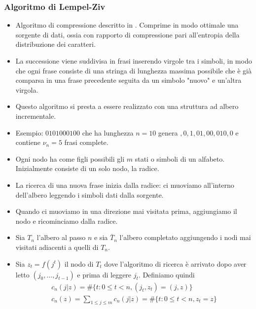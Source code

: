 \documentclass{beamer}
\theoremstyle{plain}
\theoremstyle{definition}
\theoremstyle{remark}
\begin{document}
\begin{frame}
\frametitle{Algoritmo di Lempel-Ziv}
\begin{itemize}
\item Algoritmo di compressione descritto in \cite{LZ78}. Comprime in modo ottimale una sorgente di dati, ossia con rapporto di compressione pari all'entropia della distribuzione dei caratteri.
\item La successione viene suddivisa in frasi inserendo virgole tra i simboli, in modo che ogni frase consiste di una stringa di lunghezza massima possibile che è già comparsa in una frase precedente seguita da un simbolo "nuovo" e un'altra virgola.
\item Questo algoritmo si presta a essere realizzato con una struttura ad albero incrementale.
\item Esempio: $0101000100$ che ha lunghezza $n=10$ genera $,0,1,01,00,010,0$ e contiene $\nu_n=5$ frasi complete.
\end{itemize}
\end{frame}

\begin{frame}
\begin{itemize}
\item Ogni nodo ha come figli possibili gli $m$ stati o simboli di un alfabeto. Inizialmente consiste di un solo nodo, la radice.
\item La ricerca di una nuova frase inizia dalla radice: ci muoviamo all'interno dell'albero leggendo i simboli dati dalla sorgente.
\item Quando ci muoviamo in una direzione mai visitata prima, aggiungiamo il nodo e ricominciamo dalla radice.
\item Sia $T_n$ l'albero al passo $n$ e sia $\bar{T}_n$ l'albero completato aggiungendo i nodi mai visitati adiacenti a quelli di $T_n$.
\item Sia $z_t = f(j^t)$ il nodo di $T_t$ dove l'algoritmo di ricerca è arrivato dopo aver letto $(j_0,\ldots,j_{t-1})$ e prima di leggere $j_t$. Definiamo quindi 
\begin{align*}
c_n(j|z)=\#\{t:0\leq t<n, (j_t,z_t)=(j,z)\}\\
c_n(z)=\sum_{1\leq j\leq m}{c_n(j|z)}=\#\{t:0\leq t<n,z_t=z\}
\end{align*}
\end{itemize}
\end{frame}
\end{document}
